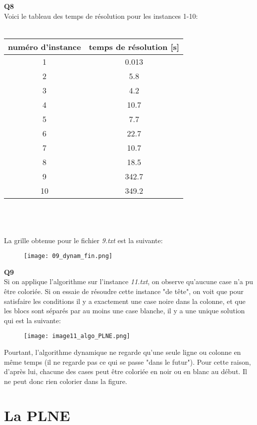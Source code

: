 \documentclass[10pt,a4paper]{article}
\begin{document}
\noindent 
\textbf{Q8}
\\
\noindent
Voici le tableau des temps de résolution pour les instances 1-10: \\ \\
\begin{tabular}{|c|c|}
\hline
numéro d'instance & temps de résolution [s]\\
\hline
\hline
1  & 0.013\\
\hline
2 & 5.8\\
\hline
3 & 4.2\\
\hline
4 & 10.7\\
\hline
5 & 7.7\\
\hline
6 & 22.7\\
\hline
7 & 10.7\\
\hline
8 & 18.5\\
\hline
9 & 342.7\\
\hline
10 & 349.2\\
\hline
\end{tabular} 
\\ \\ \\
\newpage
\noindent
La grille obtenue pour le fichier \textit{9.txt} est la suivante:

\begin{figure}[H]
\texttt{[image: 09\_dynam\_fin.png]}
\end{figure} 
\noindent
\textbf{Q9} \\
\noindent
Si on applique l'algorithme sur l'instance \textit{11.txt}, on observe qu'aucune case n'a pu être coloriée. Si on essaie de résoudre cette instance "de tête", on voit que pour satisfaire les conditions il y a exactement une case noire dans la colonne, et que les blocs sont séparés par au moins une case blanche, il y a une unique solution qui est la suivante: \\ 
\begin{figure}[H]
 \texttt{[image: image11\_algo\_PLNE.png]}
\end{figure}
\noindent
Pourtant, l'algorithme dynamique ne regarde qu'une seule ligne ou colonne en même temps (il ne regarde pas ce qui se passe "dans le futur"). Pour cette raison, d'après lui, chacune des cases peut être coloriée en noir ou en blanc au début. Il ne peut donc rien colorier dans la figure. 
\newpage
\section{La PLNE}
\end{document}
